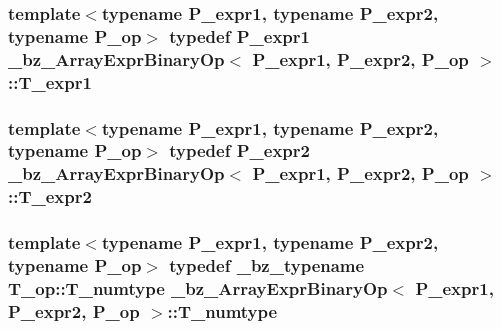 \subsubsection[{T\+\_\+expr1}]{\setlength{\rightskip}{0pt plus 5cm}template$<$typename P\+\_\+expr1, typename P\+\_\+expr2, typename P\+\_\+op$>$ typedef P\+\_\+expr1 {\bf \+\_\+bz\+\_\+\+Array\+Expr\+Binary\+Op}$<$ P\+\_\+expr1, P\+\_\+expr2, P\+\_\+op $>$\+::{\bf T\+\_\+expr1}}\label{class__bz__ArrayExprBinaryOp_af88171beef51e2874b4508cab88b3990}
\hypertarget{class__bz__ArrayExprBinaryOp_a9fbe318600732f09ecc4faebffd47a51}{}
\subsubsection[{T\+\_\+expr2}]{\setlength{\rightskip}{0pt plus 5cm}template$<$typename P\+\_\+expr1, typename P\+\_\+expr2, typename P\+\_\+op$>$ typedef P\+\_\+expr2 {\bf \+\_\+bz\+\_\+\+Array\+Expr\+Binary\+Op}$<$ P\+\_\+expr1, P\+\_\+expr2, P\+\_\+op $>$\+::{\bf T\+\_\+expr2}}\label{class__bz__ArrayExprBinaryOp_a9fbe318600732f09ecc4faebffd47a51}
\hypertarget{class__bz__ArrayExprBinaryOp_a7e6a612fc4afccbeaa3a2fdd32f8850e}{}
\subsubsection[{T\+\_\+numtype}]{\setlength{\rightskip}{0pt plus 5cm}template$<$typename P\+\_\+expr1, typename P\+\_\+expr2, typename P\+\_\+op$>$ typedef {\bf \+\_\+bz\+\_\+typename} T\+\_\+op\+::\+T\+\_\+numtype {\bf \+\_\+bz\+\_\+\+Array\+Expr\+Binary\+Op}$<$ P\+\_\+expr1, P\+\_\+expr2, P\+\_\+op $>$\+::{\bf T\+\_\+numtype}}\label{class__bz__ArrayExprBinaryOp_a7e6a612fc4afccbeaa3a2fdd32f8850e}
\hypertarget{class__bz__ArrayExprBinaryOp_a476876cf5d5b81e475d3d11cc3c2cf37}{}
